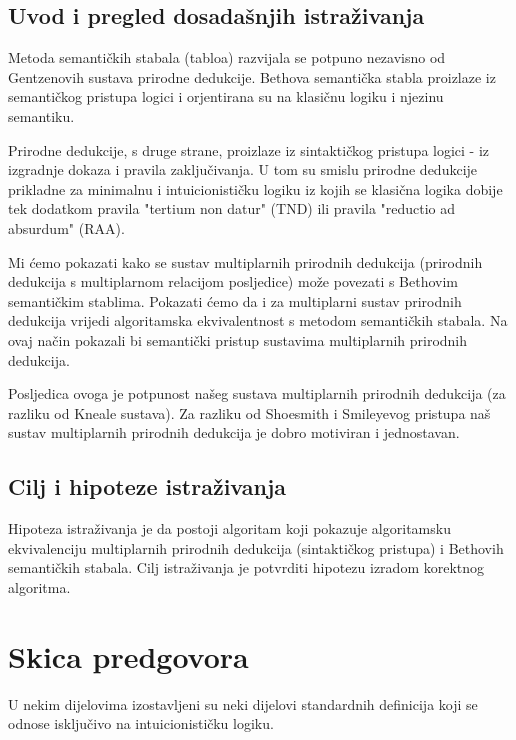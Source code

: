 \subsection*{Uvod i pregled dosadašnjih istraživanja}
% 
Metoda semantičkih stabala (tabloa) razvijala se potpuno nezavisno od Gentzenovih sustava prirodne dedukcije. Bethova
semantička stabla proizlaze iz semantičkog pristupa logici i orjentirana su na klasičnu logiku i njezinu semantiku.

Prirodne dedukcije, s druge strane, proizlaze iz sintaktičkog pristupa logici - iz izgradnje dokaza i pravila
zaključivanja. U tom su smislu prirodne dedukcije prikladne za minimalnu i intuicionističku logiku iz kojih se klasična
logika dobije tek dodatkom pravila "tertium non datur" (TND) ili pravila "reductio ad absurdum" (RAA).

Mi ćemo pokazati kako se sustav multiplarnih prirodnih dedukcija (prirodnih dedukcija s multiplarnom relacijom
posljedice) može povezati s Bethovim semantičkim stablima. Pokazati ćemo da i za multiplarni sustav prirodnih dedukcija
vrijedi algoritamska ekvivalentnost s metodom semantičkih stabala. Na ovaj način pokazali bi semantički pristup
sustavima multiplarnih prirodnih dedukcija.

Posljedica ovoga je potpunost našeg sustava multiplarnih prirodnih dedukcija (za razliku od Kneale sustava). Za razliku
od Shoesmith i Smileyevog pristupa naš sustav multiplarnih prirodnih dedukcija je dobro motiviran i jednostavan.



\subsection*{Cilj i hipoteze istraživanja}
% 
Hipoteza istraživanja je da postoji algoritam koji pokazuje algoritamsku ekvivalenciju multiplarnih prirodnih dedukcija
(sintaktičkog pristupa) i Bethovih semantičkih stabala.
Cilj istraživanja je potvrditi hipotezu izradom korektnog algoritma.


\newpage

\section{Skica predgovora}
\vspace*{10cm}


U nekim dijelovima izostavljeni su neki dijelovi standardnih definicija koji se odnose isključivo na intuicionističku logiku.

